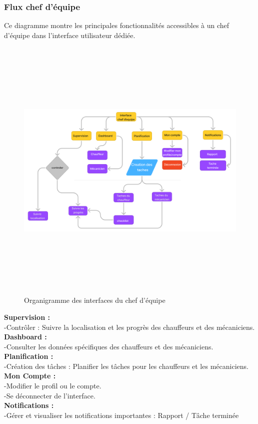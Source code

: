 

\subsubsection{Flux chef d'équipe}
Ce diagramme montre les principales fonctionnalités accessibles à un chef d'équipe dans l'interface utilisateur dédiée.\\
\begin{figure}[htbp]
  \centering
  \includegraphics[width=1\textwidth,height=13cm]{chap2.images/org chef d'equipe.png}
  \caption{Organigramme des interfaces du chef d'équipe}
\end{figure}
\newline
\noindent
\textbf{Supervision :}\\
-Contrôler : Suivre la localisation et les progrès des chauffeurs et des mécaniciens.\\
\textbf{Dashboard :}\\
-Consulter les données spécifiques des chauffeurs et des mécaniciens.\\
\textbf{Planification :}\\
-Création des tâches : Planifier les tâches pour les chauffeurs et les mécaniciens.\\
\textbf{Mon Compte :}\\
-Modifier le profil ou le compte.\\
-Se déconnecter de l'interface.\\
\textbf{Notifications :}\\
-Gérer et visualiser les notifications importantes : Rapport / Tâche terminée
\newpage

